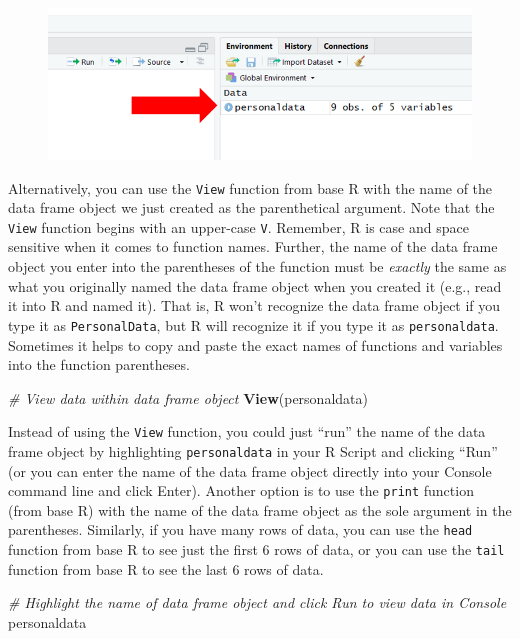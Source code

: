\documentclass[]{book}
\newenvironment{Shaded}{\begin{snugshade}}{\end{snugshade}}
\newcommand{\KeywordTok}[1]{\textcolor[rgb]{0.13,0.29,0.53}{\textbf{#1}}}
\newcommand{\CommentTok}[1]{\textcolor[rgb]{0.56,0.35,0.01}{\textit{#1}}}
\newcommand{\NormalTok}[1]{#1}
\begin{document}
\begin{figure}
\centering
\includegraphics{dfobject.png}
\caption{}
\end{figure}

Alternatively, you can use the \texttt{View} function from base R with
the name of the data frame object we just created as the parenthetical
argument. Note that the \texttt{View} function begins with an upper-case
\texttt{V}. Remember, R is case and space sensitive when it comes to
function names. Further, the name of the data frame object you enter
into the parentheses of the function must be \emph{exactly} the same as
what you originally named the data frame object when you created it
(e.g., read it into R and named it). That is, R won't recognize the data
frame object if you type it as \texttt{PersonalData}, but R will
recognize it if you type it as \texttt{personaldata}. Sometimes it helps
to copy and paste the exact names of functions and variables into the
function parentheses.

\begin{Shaded}
\begin{Highlighting}[]
\CommentTok{# View data within data frame object}
\KeywordTok{View}\NormalTok{(personaldata)}
\end{Highlighting}
\end{Shaded}

Instead of using the \texttt{View} function, you could just ``run'' the
name of the data frame object by highlighting \texttt{personaldata} in
your R Script and clicking ``Run'' (or you can enter the name of the
data frame object directly into your Console command line and click
Enter). Another option is to use the \texttt{print} function (from base
R) with the name of the data frame object as the sole argument in the
parentheses. Similarly, if you have many rows of data, you can use the
\texttt{head} function from base R to see just the first 6 rows of data,
or you can use the \texttt{tail} function from base R to see the last 6
rows of data.

\begin{Shaded}
\begin{Highlighting}[]
\CommentTok{# Highlight the name of data frame object and click Run to view data in Console}
\NormalTok{personaldata}
\end{Highlighting}
\end{Shaded}
\end{document}
